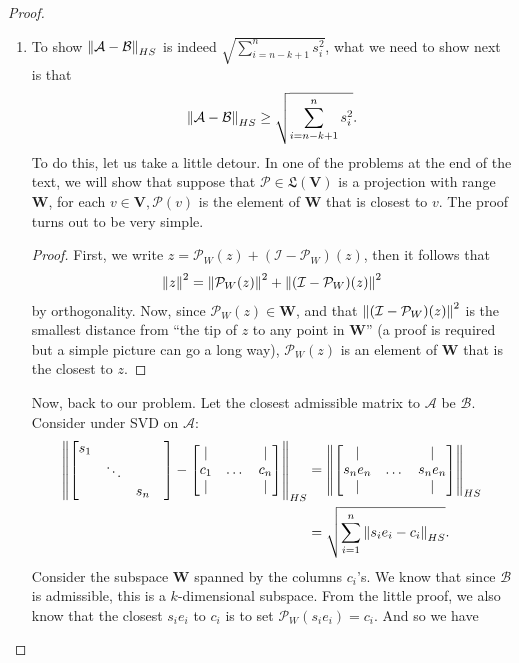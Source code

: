 \documentclass{book}
\theoremstyle{definition}
\newcommand{\V}{\mathbf{V}}
\newcommand{\W}{\mathbf{W}}
\newcommand{\A}{\mathcal{A}}
\newcommand{\B}{\mathcal{B}}
\newcommand{\LL}{\mathfrak{L}}
\newcommand{\id}{\mathcal{I}}
\begin{document}
\begin{proof}
\begin{enumerate}
		
		\item To show $\norm{\A - \B}_{HS}$ is indeed $\sqrt{\sum_{i=n-k+1}^{n} s_i^2}$, what we need to show next is that
		\begin{align*}
		\norm{\A - \B}_{HS} \geq \sqrt{\sum_{i=n-k+1}^{n} s_i^2}.
		\end{align*}
		To do this, let us take a little detour. In one of the problems at the end of the text, we will show that suppose that $\mathcal{P} \in \LL(\V)$ is a projection with range $\W$, for each $v \in \V, \mathcal{P}(v)$ is the element of $\W$ that is closest to $v$. The proof turns out to be very simple.
		\begin{proof}
			First, we write $z = \mathcal{P}_W(z) + (\id - \mathcal{P}_W)(z)$, then it follows that
			\begin{align*}
			\norm{z}^2 = \norm{\mathcal{P}_W(z)}^2 + \norm{(\id - \mathcal{P}_W)(z)}^2
			\end{align*}
			by orthogonality. Now, since $\mathcal{P}_W(z) \in \W$, and that $\norm{(\id - \mathcal{P}_W)(z)}^2$ is the smallest distance from ``the tip of $z$ to any point in $\W$'' (a proof is required but a simple picture can go a long way), $\mathcal{P}_W(z)$ is an element of $\W$ that is the closest to $z$. 
		\end{proof}
	Now, back to our problem. Let the closest admissible matrix to $\A$ be $\B$. Consider under SVD on $\A$:
	\begin{align*}
	\norm{\begin{bmatrix}
		s_1 & & \\
		& \ddots& &\\
		&&s_n
		\end{bmatrix}
	-
	\begin{bmatrix}
	| & & |\\
	c_1 & \dots & c_n\\
	| & &|  \\
	\end{bmatrix}}_{HS}
	&= \norm{\begin{bmatrix}
		| & & |\\
		s_ne_n & \dots & s_ne_n\\
		| & & |
		\end{bmatrix}}_{HS}\\
	&= \sqrt{\sum^n_{i=1}\norm{s_i e_i - c_i}_{HS}}.
	\end{align*}
	Consider the subspace $\W$ spanned by the columns $c_i$'s. We know that since $\B$ is admissible, this is a $k$-dimensional subspace. From the little proof, we also know that the closest $s_ie_i$ to $c_i$ is to set $\mathcal{P}_W(s_ie_i) = c_i$. And so we have

\end{enumerate}
\end{proof}
\end{document}
